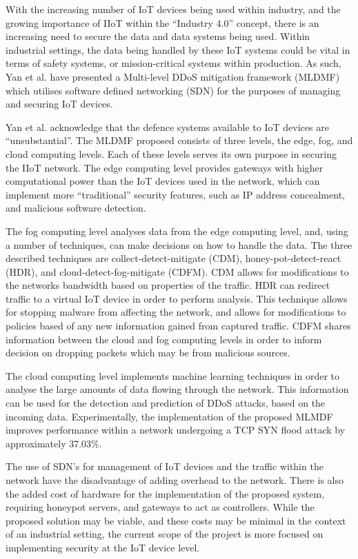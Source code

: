 With the increasing number of IoT devices being used within industry, and the
growing importance of IIoT within the ``Industry 4.0'' concept, there is an
increasing need to secure the data and data systems being used. Within
industrial settings, the data being handled by these IoT systems could be vital
in terms of safety systems, or mission-critical systems within production. As
such, Yan et al. have presented a Multi-level DDoS mitigation
framework (MLDMF) which utilises software defined networking (SDN) for the
purposes of managing and securing IoT devices\cite{iiot_2019}.

Yan et al. acknowledge that the defence systems available to IoT devices are
``unsubstantial''. The MLDMF proposed consists of three levels, the edge, fog,
and cloud computing levels. Each of these levels serves its own purpose in
securing the IIoT network. The edge computing level provides gateways with
higher computational power than the IoT devices used in the network, which can
implement more ``traditional'' security features, such as IP address
concealment, and malicious software detection.

The fog computing level analyses data from the edge computing level, and, using
a number of techniques, can make decisions on how to handle the data. The three
described techniques are collect-detect-mitigate (CDM), honey-pot-detect-react
(HDR), and cloud-detect-fog-mitigate (CDFM). CDM allows for modifications to the
networks bandwidth based on properties of the traffic. HDR can redirect traffic
to a virtual IoT device in order to perform analysis. This technique allows for
stopping malware from affecting the network, and allows for modifications to
policies based of any new information gained from captured traffic. CDFM shares
information between the cloud and fog computing levels in order to inform
decision on dropping packets which may be from malicious sources.

The cloud computing level implements machine learning techniques in order to
analyse the large amounts of data flowing through the network. This information
can be used for the detection and prediction of DDoS attacks, based on the
incoming data. Experimentally, the implementation of the proposed MLMDF improves
performance within a network undergoing a TCP SYN flood attack by approximately
37.03\%.

The use of SDN's for management of IoT devices and the traffic within the
network have the disadvantage of adding overhead to the network. There is also
the added cost of hardware for the implementation of the proposed system,
requiring honeypot servers, and gateways to act as controllers. While the
proposed solution may be viable, and these costs may be minimal in the context
of an industrial setting, the current scope of the project is more focused on
implementing security at the IoT device level.
